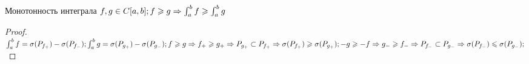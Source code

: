 \begin{theorem}{Монотонность интеграла}
$ f, g \in C[a, b]; f \geqslant g \Rightarrow \int_a^b f \geqslant \int_a^b g $
\end{theorem}
\begin{proof}
$ \int_a^b f = \sigma (P_{f_+}) - \sigma (P_{f_-}); \int_a^b g = \sigma (P_{g_+}) - \sigma (P_{g_-});
f \geqslant g \Rightarrow f_+ \geqslant g_+ \Rightarrow P_{g_+} \subset P_{f_+} \Rightarrow \sigma(P_{f_+}) \geqslant \sigma(P_{g_+});
-g \geqslant -f \Rightarrow  g_-  \geqslant f_- \Rightarrow P_{f_-} \subset P_{g_-} \Rightarrow \sigma(P_{f_-}) \leqslant \sigma(P_{g_-});$
\end{proof}